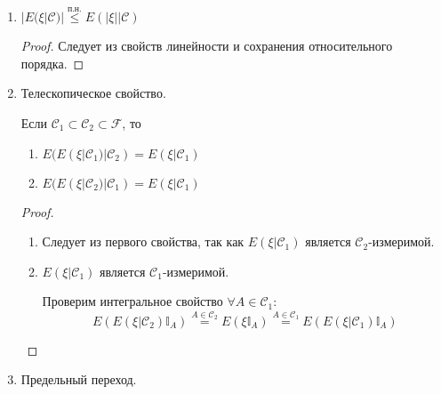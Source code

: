 \begin{enumerate}
	      Если $\xi \leq \eta$, то $E(\xi | \mathcal{C}) \stackrel{\text{п.н.}}{\leq} E(\eta | \mathcal{C})$
	      \begin{proof}
		      Рассмотрим
		      \[\forall A \in \mathcal{C}:\: \xi\mathbb{I}_A \leq \eta\mathbb{I}_A \Rightarrow E(E(\xi|\mathcal{C})\mathbb{I}_A) = E(\xi\mathbb{I}_A) \leq E(\eta\mathbb{I}_A) = E(E(\eta | \mathcal{C})\mathbb{I}_A)\]
	      \end{proof}
	      Раз $E(\xi | \mathcal{C})$ и $E(\eta | \mathcal{C})$ являются $\mathcal{C}$-измеримыми, то по свойству обычного матожидания
	      \[E(\xi | \mathcal{C}) \stackrel{\text{п.н.}}{\leq} E(\eta | \mathcal{C})\]
	\item $|E(\xi | \mathcal{C})| \stackrel{\text{п.н.}}{\leq} E(|\xi| | \mathcal{C})$
	      \begin{proof}
		      Следует из свойств линейности и сохранения относительного порядка.
	      \end{proof}
	\item Телескопическое свойство.

	      Если $\mathcal{C}_1 \subset \mathcal{C}_2 \subset \mathcal{F}$, то
	      \begin{enumerate}
		      \item $E(E(\xi | \mathcal{C}_1) | \mathcal{C}_2) = E(\xi | \mathcal{C}_1)$
		      \item $E(E(\xi | \mathcal{C}_2) | \mathcal{C}_1) = E(\xi | \mathcal{C}_1)$
	      \end{enumerate}
	      \begin{proof}
		      \begin{enumerate}
			      \item Следует из первого свойства, так как $E(\xi | \mathcal{C}_1)$ является $\mathcal{C}_2$-измеримой.
			      \item $E(\xi | \mathcal{C}_1)$ является $\mathcal{C}_1$-измеримой.

			            Проверим интегральное свойство $\forall A \in \mathcal{C}_1$:
			            \[E(E(\xi | \mathcal{C}_2)\mathbb{I}_A) \stackrel{A \in \mathcal{C}_2}{=} E(\xi\mathbb{I}_A) \stackrel{A \in \mathcal{C}_1}{=} E(E(\xi | \mathcal{C}_1)\mathbb{I}_A)\]
		      \end{enumerate}
	      \end{proof}
	\item Предельный переход.


\end{enumerate}
